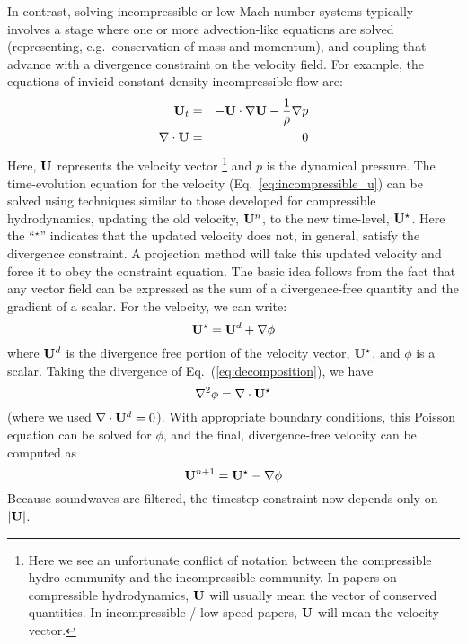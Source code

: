 In contrast, solving incompressible or low Mach number systems
typically involves a stage where one or more
advection-like equations are solved (representing, e.g.\ conservation of mass and
momentum), and coupling that advance with a divergence constraint on the velocity field.
For example, the equations of invicid constant-density incompressible flow
are:
\begin{eqnarray}
{\bf U}_t &=& -{\bf U} \cdot \nabla {\bf U} - \frac{1}{\rho}\nabla p \label{eq:incompressible_u} \\
\nabla \cdot {\bf U} &=& 0
\end{eqnarray}
Here, ${\bf U}$ represents the velocity vector%
%
\footnote{Here we see an unfortunate conflict
of notation between the compressible hydro community and the
incompressible community.  In papers on compressible hydrodynamics,
${\bf U}$ will usually mean the vector of conserved quantities.  In 
incompressible / low speed papers, ${\bf U}$ will mean the velocity vector.}
%
and $p$ is the dynamical pressure.  The time-evolution equation for
the velocity (Eq.~\ref{eq:incompressible_u}) can be solved using
techniques similar to those developed for compressible hydrodynamics,
updating the old velocity, ${\bf U}^n$, to the new time-level, ${\bf U}^\star$.
Here the ``$^\star$'' indicates that the updated velocity does not, in
general, satisfy the divergence constraint.  A projection method will
take this updated velocity and force it to obey the constraint
equation.  The basic idea follows from the fact that any vector
field can be expressed as the sum of a divergence-free quantity and
the gradient of a scalar.  For the velocity, we can write:
\begin{equation}
{\bf U}^\star = {\bf U}^d + \nabla \phi \label{eq:decomposition}
\end{equation}
where ${\bf U}^d$ is the divergence free portion of the velocity vector,
${\bf U}^\star$, and $\phi$ is a scalar.  Taking the divergence of
Eq.~(\ref{eq:decomposition}), we have
\begin{equation}
\nabla^2 \phi = \nabla \cdot {\bf U}^\star
\end{equation}
(where we used $\nabla \cdot {\bf U}^d = 0$).
With appropriate boundary conditions, this Poisson equation can be
solved for $\phi$, and the final, divergence-free velocity can 
be computed as
\begin{equation}
{\bf U}^{n+1} = {\bf U}^\star - \nabla \phi
\end{equation}
Because soundwaves are filtered, the timestep constraint now depends only
on $|{\bf U}|$.

